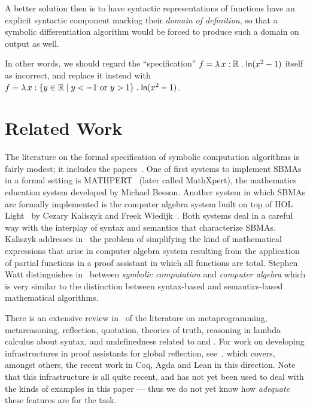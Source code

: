 \documentclass[fleqn]{llncs}
\newcommand{\RR}{\ensuremath{\mathbb{R}}}
\begin{document}
A better solution then is to have syntactic representations of functions have
an explicit syntactic component marking their \emph{domain of definition},
so that a symbolic differentiation algorithm would be forced to produce
such a domain on output as well.

In other words, we should regard the ``specification''
$f = \LambdaApp x : \RR \mdot \mname{ln}(x^2 - 1)$ itself as incorrect,
and replace it instead with
$f = \LambdaApp x : \set{y \in \RR \mid y < -1 \text{ or } y > 1}
\mdot \mname{ln}(x^2 - 1)$.

\section{Related Work}\label{sec:related-work}

The literature on the formal specification of symbolic computation
algorithms is fairly modest; it includes the
papers~\cite{DunstanEtAl98,Khan14,KhanSchreiner12,LimongelliTemperini92}.
One of first systems to implement SBMAs in a formal setting is
MATHPERT~\cite{Beeson89} (later called MathXpert), the mathematics
education system developed by Michael Beeson.  Another system in which
SBMAs are formally implemented is the computer algebra system built on
top of HOL Light~\cite{Harrison09} by Cezary Kaliszyk and Freek
Wiedijk~\cite{KaliszykWiedijk07}.  Both systems deal in a careful way
with the interplay of syntax and semantics that characterize SBMAs.
Kaliszyk addresses in~\cite{Kaliszyk08} the problem of simplifying the
kind of mathematical expressions that arise in computer algebra system
resulting from the application of partial functions in a proof
assistant in which all functions are total.  Stephen Watt
distinguishes in~\cite{Watt06} between \emph{symbolic computation} and
\emph{computer algebra} which is very similar to the distinction
between syntax-based and semantics-based mathematical algorithms.

\bsp There is an extensive review in~\cite{Farmer18} of the literature
on metaprogramming, metareasoning, reflection, quotation, theories of
truth, reasoning in lambda calculus about syntax, and undefinedness
related to {\churchqe} and {\churchuqe}.  For work on developing
infrastructures in proof assistants for global reflection,
see~\cite{AnandEtAl18,BoyerMoore81,BuchbergerEtAl06,Christiansen:2014,ebner2017metaprogramming,MelhamEtAl13,VanDerWaltSwierstra12},
which covers, amongst others, the recent work in Coq, Agda and Lean in this
direction. Note that this infrastructure is all quite recent, and has not
yet been used to deal with the kinds of examples in this paper --- thus
we do not yet know how \emph{adequate} these features are for the task.
\esp
\end{document}
